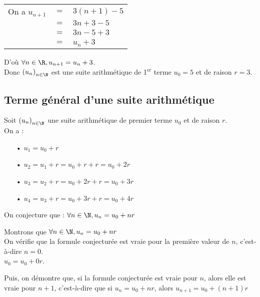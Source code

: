 \vspace*{.3cm}

\begin{tabular}{lll}
On a $u_{n+1}$ & $ = $ & $ 3\left(n+1\right)-5$ \\
& $=$ & $3n + 3 - 5$ \\
& $=$ & $3n - 5 + 3$ \\
& $=$ & $u_n + 3$ \\
\end{tabular}

\vspace*{.3cm}

D'où $\forall n \in \R, u_{n+1} = u_n + 3$. \\

Donc $\left(u_n\right)_{n \in \N}$ est une suite arithmétique de 1$^{\mathrm{er}}$ terme $u_0 = 5$ et de raison $r = 3$. 

\subsection{Terme général d'une suite arithmétique}

Soit $\left(u_n\right)_{n \in \N}$ une suite arithmétique de premier terme $u_0$ et de raison $r$. \\

On a :

\begin{itemize}
\item[•] $u_1 = u_0 + r$
\item[•] $u_2 = u_1 + r = u_0 + r + r = u_0 + 2r$
\item[•] $u_3 = u_2 + r = u_0 + 2r + r = u_0 + 3r$
\item[•] $u_4 = u_3 + r = u_0 + 3r + r = u_0 + 4r$
\end{itemize}

\vspace*{.3cm}

On conjecture que : $\forall n \in \N, u_n = u_0 + nr$ \\

\newpage

Montrons que $\forall n \in \N, u_n = u_0 + nr$ \\

On vérifie que la formule conjecturée est vraie pour la première valeur de $n$, c'est-à-dire $n = 0$. \\

$u_0 = u_0 + 0r$. 

Puis, on démontre que, si la formule conjecturée est vraie pour $n$, alors elle est vraie pour $n+1$, c'est-à-dire que si $u_n = u_0 + nr$, alors $u_{n+1} = u_0 + \left(n+1\right)r$ \\

